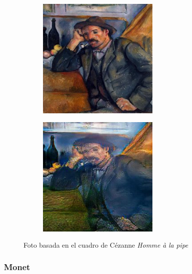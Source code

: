\documentclass[[../main.tex]{subfiles}
\begin{document}
        \begin{figure}[!htb]
            \begin{subfigure}[b]{0.49\textwidth}
            \includegraphics[width=0.65\textwidth]{imagenes/cuadro2imagen/cezanne/00570.jpg}
            \end{subfigure}
        \hfill
            \begin{subfigure}[b]{0.49\textwidth}
            \includegraphics[width=0.65\textwidth]{imagenes/cuadro2imagen/cezanne/00570_2.jpg}
            \end{subfigure}
        \caption{Foto basada en el cuadro de Cézanne \textit{Homme à la pipe}}
        \label{fig:cezanne_foto_pipa}
        \end{figure}
        
        \newpage

\subsubsection{Monet}
\end{document}
